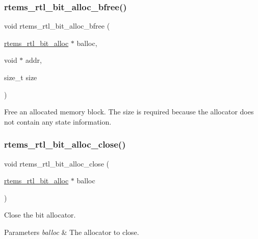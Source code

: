 \subsubsection{\texorpdfstring{rtems\_rtl\_bit\_alloc\_bfree()}{rtems\_rtl\_bit\_alloc\_bfree()}}
{\footnotesize\ttfamily void rtems\+\_\+rtl\+\_\+bit\+\_\+alloc\+\_\+bfree (\begin{DoxyParamCaption}\item[{\mbox{\hyperlink{structrtems__rtl__bit__alloc}{rtems\+\_\+rtl\+\_\+bit\+\_\+alloc}} $\ast$}]{balloc,  }\item[{void $\ast$}]{addr,  }\item[{size\+\_\+t}]{size }\end{DoxyParamCaption})}

Free an allocated memory block. The size is required because the allocator does not contain any state information. \mbox{\label{rtl-bit-alloc_8h_ae20e516fc07b19dc0d56f5ed4a83e677}} 
\subsubsection{\texorpdfstring{rtems\_rtl\_bit\_alloc\_close()}{rtems\_rtl\_bit\_alloc\_close()}}
{\footnotesize\ttfamily void rtems\+\_\+rtl\+\_\+bit\+\_\+alloc\+\_\+close (\begin{DoxyParamCaption}\item[{\mbox{\hyperlink{structrtems__rtl__bit__alloc}{rtems\+\_\+rtl\+\_\+bit\+\_\+alloc}} $\ast$}]{balloc }\end{DoxyParamCaption})}

Close the bit allocator.


\begin{DoxyParams}{Parameters}
{\em balloc} & The allocator to close. \\
\hline
\end{DoxyParams}
\mbox{\label{rtl-bit-alloc_8h_a68fb715e86083d53b06b7381b4f0645b}} 
